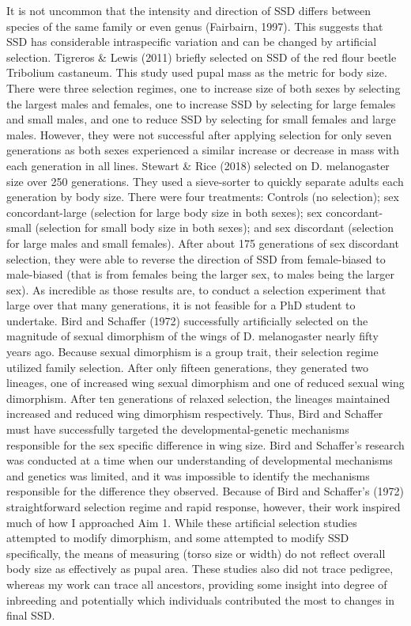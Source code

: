 \documentclass[
  11pt,
]{article}
\begin{document}
It is not uncommon that the intensity and direction of SSD differs
between species of the same family or even genus (Fairbairn, 1997). This
suggests that SSD has considerable intraspecific variation and can be
changed by artificial selection. Tigreros \& Lewis (2011) briefly
selected on SSD of the red flour beetle Tribolium castaneum. This study
used pupal mass as the metric for body size. There were three selection
regimes, one to increase size of both sexes by selecting the largest
males and females, one to increase SSD by selecting for large females
and small males, and one to reduce SSD by selecting for small females
and large males. However, they were not successful after applying
selection for only seven generations as both sexes experienced a similar
increase or decrease in mass with each generation in all lines. Stewart
\& Rice (2018) selected on D. melanogaster size over 250 generations.
They used a sieve-sorter to quickly separate adults each generation by
body size. There were four treatments: Controls (no selection); sex
concordant-large (selection for large body size in both sexes); sex
concordant-small (selection for small body size in both sexes); and sex
discordant (selection for large males and small females). After about
175 generations of sex discordant selection, they were able to reverse
the direction of SSD from female-biased to male-biased (that is from
females being the larger sex, to males being the larger sex). As
incredible as those results are, to conduct a selection experiment that
large over that many generations, it is not feasible for a PhD student
to undertake. Bird and Schaffer (1972) successfully artificially
selected on the magnitude of sexual dimorphism of the wings of D.
melanogaster nearly fifty years ago. Because sexual dimorphism is a
group trait, their selection regime utilized family selection. After
only fifteen generations, they generated two lineages, one of increased
wing sexual dimorphism and one of reduced sexual wing dimorphism. After
ten generations of relaxed selection, the lineages maintained increased
and reduced wing dimorphism respectively. Thus, Bird and Schaffer must
have successfully targeted the developmental-genetic mechanisms
responsible for the sex specific difference in wing size. Bird and
Schaffer's research was conducted at a time when our understanding of
developmental mechanisms and genetics was limited, and it was impossible
to identify the mechanisms responsible for the difference they observed.
Because of Bird and Schaffer's (1972) straightforward selection regime
and rapid response, however, their work inspired much of how I
approached Aim 1. While these artificial selection studies attempted to
modify dimorphism, and some attempted to modify SSD specifically, the
means of measuring (torso size or width) do not reflect overall body
size as effectively as pupal area. These studies also did not trace
pedigree, whereas my work can trace all ancestors, providing some
insight into degree of inbreeding and potentially which individuals
contributed the most to changes in final SSD.


\end{document}

